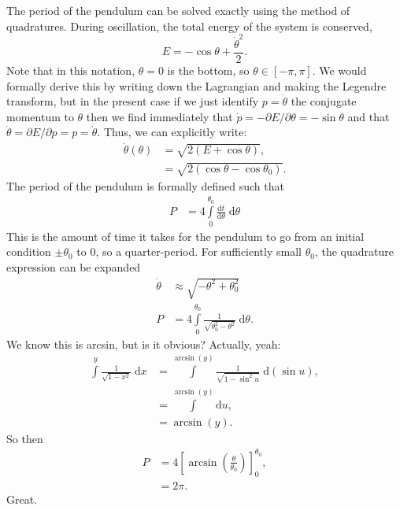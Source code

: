 \documentclass[12pt]{article}
\newcommand*{\rd}[2]{\frac{\mathrm{d}#1}{\mathrm{d}#2}}
\newcommand*{\pdil}[2]{\partial#1 / \partial#2}
\newcommand*{\p}[1]{\left(#1\right)}
\newcommand*{\s}[1]{\left[#1\right]}
\begin{document}
The period of the pendulum can be solved exactly using the method of
quadratures. During oscillation, the total energy of the system is conserved,
\begin{equation}
    E = -\cos \theta + \frac{\dot{\theta}^2}{2}.
\end{equation}
Note that in this notation, $\theta = 0$ is the bottom, so $\theta \in [-\pi,
\pi]$. We would formally derive this by writing down the Lagrangian and making
the Legendre transform, but in the present case if we just identify $p =
\dot{\theta}$ the conjugate momentum to $\theta$ then we find immediately that
$\dot{p} = -\pdil{E}{\theta} = -\sin\theta$ and that $\dot{\theta} = \pdil{E}{p}
= p = \dot{\theta}$. Thus, we can explicitly write:
\begin{align*}
    \dot{\theta}(\theta) &= \sqrt{2(E + \cos \theta)},\\
        &= \sqrt{2\p{\cos\theta - \cos\theta_0}}.
\end{align*}
The period of the pendulum is formally defined such that
\begin{align*}
    P &= 4\int\limits_0^{\theta_0}\rd{t}{\theta}\;\mathrm{d}\theta
\end{align*}
This is the amount of time it takes for the pendulum to go from an initial
condition $\pm \theta_0$ to $0$, so a quarter-period. For sufficiently small
$\theta_0$, the quadrature expression can be expanded
\begin{align*}
    \dot{\theta} &\approx \sqrt{-\theta^2 + \theta_0^2}\\
    P &= 4\int\limits_0^{\theta_0} \frac{1}{\sqrt{\theta_0^2 - \theta^2}}
            \;\mathrm{d}\theta.
\end{align*}
We know this is arcsin, but is it obvious? Actually, yeah:
\begin{align*}
    \int\limits^y\frac{1}{\sqrt{1 - x^2}}\;\mathrm{d}x
        &= \int\limits^{\arcsin(y)}
            \frac{1}{\sqrt{1 - \sin^2u}}\;\mathrm{d}(\sin u),\\
        &= \int\limits^{\arcsin(y)}\mathrm{d}u,\\
        &= \arcsin(y).
\end{align*}
So then
\begin{align*}
    P &= 4\s{\arcsin\p{\frac{\theta}{\theta_0}}}_0^{\theta_0},\\
        &= 2\pi.
\end{align*}
Great.
\end{document}
